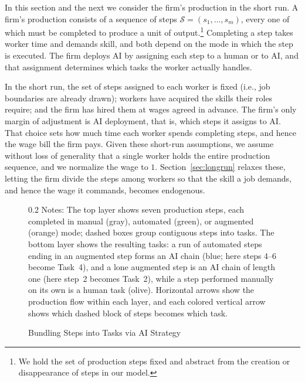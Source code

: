 In this section and the next we consider the firm's production in the short run.
A firm's production consists of a sequence of steps $\mathcal{S}=(s_1,\ldots,s_m)$, every one of which must be completed to produce a unit of output.\footnote{
We hold the set of production steps fixed and abstract from the creation or disappearance of steps in our model.
}
Completing a step takes worker time and demands skill, and both depend on the mode in which the step is executed.
The firm deploys AI by assigning each step to a human or to AI, and that assignment determines which tasks the worker actually handles.

In the short run, the set of steps assigned to each worker is fixed (i.e., job boundaries are already drawn); workers have acquired the skills their roles require; and the firm has hired them at wages agreed in advance.
The firm's only margin of adjustment is AI deployment, that is, which steps it assigns to AI.
That choice sets how much time each worker spends completing steps, and hence the wage bill the firm pays.
Given these short-run assumptions, we assume without loss of generality that a single worker holds the entire production sequence, and we normalize the wage to $1$.
Section~\ref{sec:longrun} relaxes these, letting the firm divide the steps among workers so that the skill a job demands, and hence the wage it commands, becomes endogenous.

\begin{figure}[!t]
  \centering
  \caption{Bundling Steps into Tasks via AI Strategy}
  \label{fig:steps_tasks}
  
  \par\vspace{\fignotesskip}
\begin{minipage}{1\linewidth}
\begin{spacing}{0.2}
{\fontsize{9.5pt}{10pt}\selectfont Notes: The top layer shows seven production steps, each completed in manual (gray), automated (green), or augmented (orange) mode; dashed boxes group contiguous steps into tasks. The bottom layer shows the resulting tasks: a run of automated steps ending in an augmented step forms an AI chain (blue; here steps 4--6 become Task~4), and a lone augmented step is an AI chain of length one (here step~2 becomes Task~2), while a step performed manually on its own is a human task (olive). Horizontal arrows show the production flow within each layer, and each colored vertical arrow shows which dashed block of steps becomes which task.}
\end{spacing}
\end{minipage}
\end{figure}



